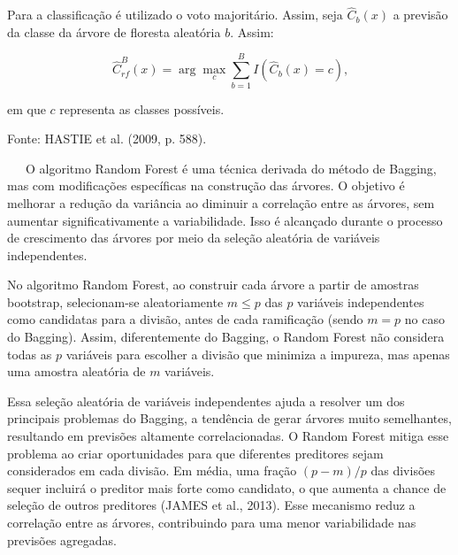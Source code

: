 \documentclass[
  12pt,
  a4paper,
]{scrreprt}
\begin{document}
\begin{algo}
{\begin{algorithm}[H]
\begin{algorithmic}
\vspace{1em}

\State \hspace{0.7em} Para a classificação é utilizado o voto majoritário. Assim, seja $\hat{C}_{b}\left(x\right)$ a previsão da classe da árvore de floresta aleatória $b$. Assim:

$$
\hat{C}^{B}_{rf}\left(x\right) = \arg \max_c \sum^{B}_{b = 1}I\left(\hat{C}_b\left(x\right) = c\right)\text{,}
$$

\State em que $c$ representa as classes possíveis.

\end{algorithmic}
\end{algorithm}

}

\caption{\label{algo-rf}Fonte: HASTIE et al. (2009, p. 588).}

\end{algo}%

~~~O algoritmo Random Forest é uma técnica derivada do método de
Bagging, mas com modificações específicas na construção das árvores. O
objetivo é melhorar a redução da variância ao diminuir a correlação
entre as árvores, sem aumentar significativamente a variabilidade. Isso
é alcançado durante o processo de crescimento das árvores por meio da
seleção aleatória de variáveis independentes.

\vspace{12pt}

No algoritmo Random Forest, ao construir cada árvore a partir de
amostras bootstrap, selecionam-se aleatoriamente \(m \leq p\) das \(p\)
variáveis independentes como candidatas para a divisão, antes de cada
ramificação (sendo \(m = p\) no caso do Bagging). Assim, diferentemente
do Bagging, o Random Forest não considera todas as \(p\) variáveis para
escolher a divisão que minimiza a impureza, mas apenas uma amostra
aleatória de \(m\) variáveis.

\vspace{12pt}

Essa seleção aleatória de variáveis independentes ajuda a resolver um
dos principais problemas do Bagging, a tendência de gerar árvores muito
semelhantes, resultando em previsões altamente correlacionadas. O Random
Forest mitiga esse problema ao criar oportunidades para que diferentes
preditores sejam considerados em cada divisão. Em média, uma fração
\((p - m)/p\) das divisões sequer incluirá o preditor mais forte como
candidato, o que aumenta a chance de seleção de outros preditores (JAMES
et al., 2013). Esse mecanismo reduz a correlação entre as árvores,
contribuindo para uma menor variabilidade nas previsões agregadas.
\end{document}

